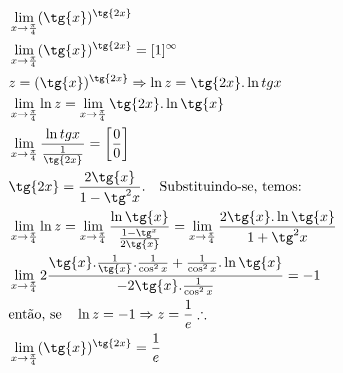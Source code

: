 \begin{ex}
\begin{align}
&\lim_{x\rightarrow \frac{\pi}{4}} (\tg{x})^{\tg{2x}}\nonumber\\
&\lim_{x\rightarrow \frac{\pi}{4}} (\tg{x})^{\tg{2x}}=[1]^\infty\nonumber\\
&z=(\tg{x})^{\tg{2x}} \Rightarrow \ln{z}=\tg{2x}.\ln{tg{x}}\nonumber\\
&\lim_{x\rightarrow \frac{\pi}{4}} \ln{z}=\lim_{x\rightarrow \frac{\pi}{4}} \tg{2x}.\ln{\tg{x}}\nonumber\\
&\lim_{x\rightarrow \frac{\pi}{4}} \frac{\ln{tg{x}}}{\frac{1}{\tg{2x}}}=\left[\frac{0}{0}\right]\nonumber\\
&\tg{2x}=\frac{2\tg{x}}{1-\tg^2{x}}.\quad \text{Substituindo-se, temos:}\nonumber\\
&\lim_{x\rightarrow \frac{\pi}{4}} \ln{z}=\lim_{x\rightarrow \frac{\pi}{4}} \frac{\ln{\tg{x}}}{\frac{1-\tg^{x}}{2\tg{x}}}=\lim_{x\rightarrow \frac{\pi}{4}} \frac{2\tg{x}.\ln{\tg{x}}}{1+\tg^2{x}}\nonumber\\
&\lim_{x\rightarrow \frac{\pi}{4}} 2\frac{\tg{x}.\frac{1}{\tg{x}}.\frac{1}{\cos^2{x}}+\frac{1}{\cos^2{x}}.\ln{\tg{x}}}{-2\tg{x}.\frac{1}{\cos^2{x}}}=-1\nonumber\\
&\text{então, se}\quad \ln{z}=-1 \Rightarrow z=\frac{1}{e}\therefore\nonumber\\
&\lim_{x\rightarrow \frac{\pi}{4}} (\tg{x})^{\tg{2x}}=\frac{1}{e}\nonumber
\end{align}
\end{ex}